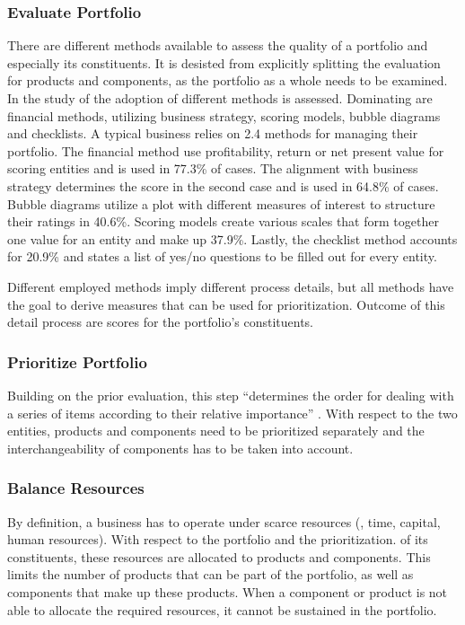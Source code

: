 	\subsubsection{Evaluate Portfolio}
	There are different methods available to assess the quality of a portfolio and especially its constituents. It is desisted from explicitly splitting the evaluation for products and components, as the portfolio as a whole needs to be examined. In the study of \cite{cooper1999new} the adoption of different methods is assessed. Dominating are financial methods, utilizing business strategy, scoring models, bubble diagrams and checklists. A typical business relies on 2.4 methods for managing their portfolio. The financial method use profitability, return or net present value for scoring entities and is used in 77.3\% of cases. The alignment with business strategy determines the score in the second case and is used in 64.8\% of cases. Bubble diagrams utilize a plot with different measures of interest to structure their ratings in 40.6\%. Scoring models create various scales that form together one value for an entity and make up 37.9\%. Lastly, the checklist method accounts for 20.9\% and states a list of yes/no questions to be filled out for every entity.  
	
	Different employed methods imply different process details, but all methods have the goal to derive measures that can be used for prioritization. Outcome of this detail process are scores for the portfolio's constituents. 
	
	\subsubsection{Prioritize Portfolio}
	Building on the prior evaluation, this step \enquote{determines the order for dealing with a series of items according to their relative importance} \citep{oxfordprioritize}. With respect to the two entities, products and components need to be prioritized separately and the interchangeability of components has to be taken into account. 		
	\subsubsection{Balance Resources}
	By definition, a business has to operate under scarce resources (\eg, time, capital, human resources). With respect to the portfolio and the prioritization. of its constituents, these resources are allocated to products and components. This limits the number of products that can be part of the portfolio, as well as components that make up these products. When a component or product is not able to allocate the required resources, it cannot be sustained in the portfolio.
	
